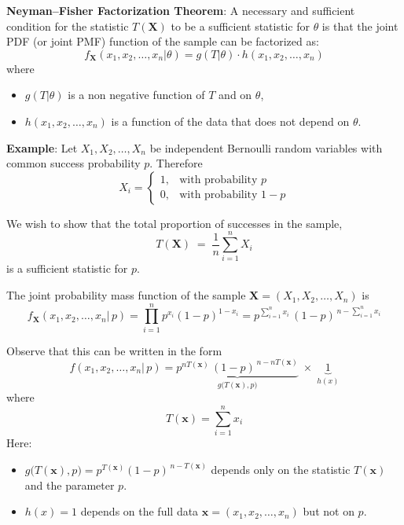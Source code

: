 \documentclass[twoside]{book}
\begin{document}
\begin{enumerate}
    \begin{textbox}
    \textbf{Neyman–Fisher Factorization Theorem}: A necessary and sufficient condition for the statistic $T(\textbf{X})$ to be a sufficient statistic for $\theta$ is that the joint PDF (or joint PMF) function of the sample can be factorized as:
        \[
         f_{\mathbf{X}}(x_1, x_2, \ldots, x_n| \theta) = g(T| \theta) \cdot h(x_1, x_2, \ldots, x_n)
        \]
        where
        \begin{itemize}
            \item $g(T| \theta)$ is a non negative function of $T$ and on $\theta$,
            \item $h(x_1, x_2, \ldots, x_n)$ is a function of the data that does not depend on $\theta$.
        \end{itemize}
    \end{textbox}
    
    \bigskip
    
    \textbf{Example}: Let \(X_1, X_2, \dots, X_n\) be independent Bernoulli random variables with common success probability \(p\). Therefore  
    \[
    X_i =
    \begin{cases}
    1, & \text{with probability } p\\
    0, & \text{with probability } 1 - p
    \end{cases}
    \]
    
    We wish to show that the total proportion of successes in the sample,
    \[
    T(\mathbf{X}) \;=\; \frac{1}{n}\sum_{i=1}^n X_i
    \]
    is a sufficient statistic for \(p\).
    
    
    The joint probability mass function of the sample \(\textbf{X} = (X_1,X_2,\dots,X_n)\) is
    \[
    f_{\textbf{X}}(x_1,x_2,\dots,x_n|\,p) = \prod_{i=1}^{n} p^{x_i}(1-p)^{1-x_i}
    =
    p^{\sum_{i=1}^n x_i}
    \,(1 - p)^{\,n - \sum_{i=1}^n x_i}
    \]
      
    Observe that this can be written in the form
    \[
    f(x_1,x_2,\dots,x_n|\,p)
    =
    \underbrace{p^{nT(\textbf{x})} \,(1-p)^{\,n - nT(\textbf{x})}}_{g\bigl(T(\textbf{x}),p\bigr)}
    \;\times\;
    \underbrace{1}_{h(x)}
    \]
    where
    \[
    T(\textbf{x}) = \sum_{i=1}^n x_i
    \]
    Here:
    \begin{itemize}
      \item \(g\bigl(T(\textbf{x}),p\bigr) = p^{T(\textbf{x})} (1-p)^{\,n - T(\textbf{x})}\) depends only on the statistic \(T(\textbf{x})\) and the parameter \(p\).
      \item \(h(x) = 1\) depends on the full data \(\mathbf{x} = (x_1,x_2,\dots,x_n)\) but not on \(p\).
    \end{itemize}
    

\end{enumerate}
\end{document}
